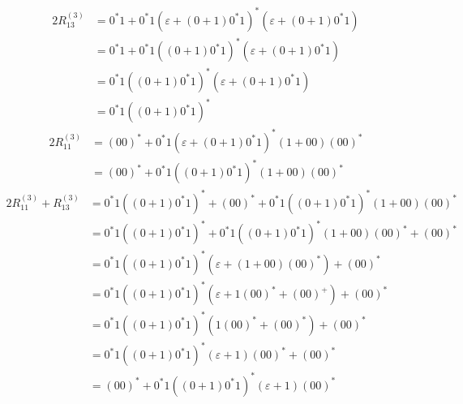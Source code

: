 {\begin{center}
\begin{tabular}{r || c c | c c | c c}
\end{tabular} \end{center}
\begin{alignat*}{2}
	R_{13}^{(3)}
	&= 0^*1+0^*1(\varepsilon +(0+1)0^*1)^*(\varepsilon +(0+1)0^*1)\\
	&= 0^*1+0^*1((0+1)0^*1)^*(\varepsilon +(0+1)0^*1)\\
	&= 0^*1((0+1)0^*1)^*(\varepsilon +(0+1)0^*1)\\
	&= 0^*1((0+1)0^*1)^*
\end{alignat*}
\begin{alignat*}{2}
	R_{11}^{(3)}
	&= (00)^* + 0^*1(\varepsilon+(0+1)0^*1)^* (1+00)(00)^* \\
	&= (00)^* + 0^*1((0+1)0^*1)^* (1+00)(00)^* 
\end{alignat*}
\begin{alignat*}{2}
	R_{11}^{(3)}+R_{13}^{(3)}
	&= 0^*1((0+1)0^*1)^* + (00)^* + 0^*1((0+1)0^*1)^* (1+00)(00)^* \\
	&= 0^*1((0+1)0^*1)^* + 0^*1((0+1)0^*1)^* (1+00)(00)^* + (00)^* \\
	&= 0^*1((0+1)0^*1)^*(\varepsilon + (1+00)(00)^*) + (00)^* \\
	&= 0^*1((0+1)0^*1)^*(\varepsilon + 1(00)^*+(00)^+) + (00)^* \\
	&= 0^*1((0+1)0^*1)^*(1(00)^*+(00)^*) + (00)^* \\
	&= 0^*1((0+1)0^*1)^*(\varepsilon + 1)(00)^* + (00)^* \\
	&= (00)^*  + 0^*1((0+1)0^*1)^*(\varepsilon + 1)(00)^*
\end{alignat*}
}
